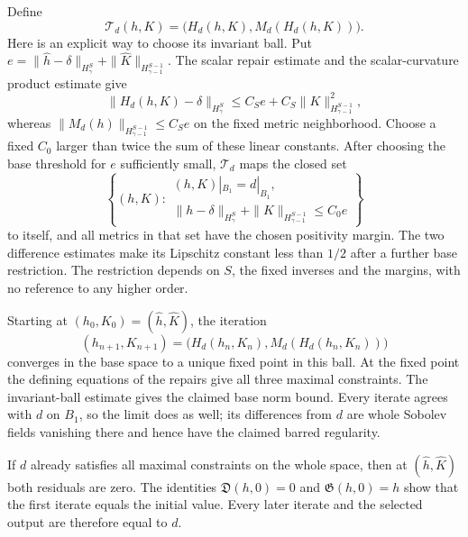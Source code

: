 \documentclass[
  english,
  11pt,
  reqno]{amsart}
\begin{document}
Define \[
\mathcal T_d(h,K)
=\bigl(H_d(h,K),M_d(H_d(h,K))\bigr).
\] Here is an explicit way to choose its invariant ball. Put
\(e=\|\widehat h-\delta\|_{H^S_\gamma}
+\|\widehat K\|_{H^{S-1}_{\gamma-1}}\). The scalar repair estimate and
the scalar-curvature product estimate give \[
\|H_d(h,K)-\delta\|_{H^S_\gamma}
\le C_S e+C_S\|K\|_{H^{S-1}_{\gamma-1}}^2,
\] whereas \(\|M_d(h)\|_{H^{S-1}_{\gamma-1}}\le C_S e\) on the fixed
metric neighborhood. Choose a fixed \(C_0\) larger than twice the sum of
these linear constants. After choosing the base threshold for \(e\)
sufficiently small, \(\mathcal T_d\) maps the closed set \[
\left\{(h,K):
\begin{gathered}
(h,K)|_{B_1}=d|_{B_1},\\
\|h-\delta\|_{H^S_\gamma}
+\|K\|_{H^{S-1}_{\gamma-1}}\le C_0e
\end{gathered}
\right\}
\] to itself, and all metrics in that set have the chosen positivity
margin. The two difference estimates make its Lipschitz constant less
than \(1/2\) after a further base restriction. The restriction depends
on \(S\), the fixed inverses and the margins, with no reference to any
higher order.

Starting at \((h_0,K_0)=(\widehat h,\widehat K)\), the iteration%
 \[
(h_{n+1},K_{n+1})
=\bigl(H_d(h_n,K_n),M_d(H_d(h_n,K_n))\bigr)
\] converges in the base space to a unique fixed point in this ball. At
the fixed point the defining equations of the repairs give all three
maximal constraints. The invariant-ball estimate gives the claimed base
norm bound. Every iterate agrees with \(d\) on \(B_1\), so the limit
does as well; its differences from \(d\) are whole Sobolev fields
vanishing there and hence have the claimed barred regularity.

If \(d\) already satisfies all maximal constraints on the whole space,
then at \((\widehat h,\widehat K)\) both residuals are zero. The
identities \(\mathfrak D(h,0)=0\) and \(\mathfrak G(h,0)=h\) show that
the first iterate equals the initial value. Every later iterate and the
selected output are therefore equal to \(d\).
\end{document}
